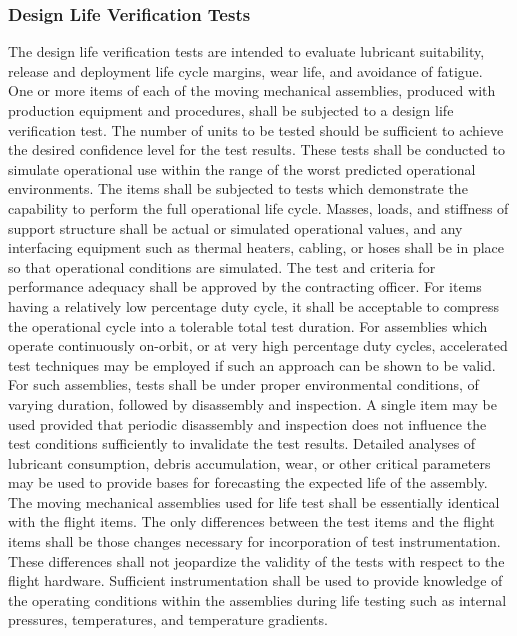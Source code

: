 \documentclass[12pt]{article}
\begin{document}
\subsubsection{Design Life Verification Tests} %
The design life verification tests are intended to evaluate lubricant suitability, release and deployment life cycle margins, wear life, and avoidance of fatigue. 
One or more items of each of the moving mechanical assemblies, produced with production equipment and procedures, shall be subjected to a design life verification test. 
The number of units to be tested should be sufficient to achieve the desired confidence level for the test results. 
These tests shall be conducted to simulate operational use within the range of the worst predicted operational environments. 
The items shall be subjected to tests which demonstrate the capability to perform the full operational life cycle. 
Masses, loads, and stiffness of support structure shall be actual or simulated operational values, and any interfacing equipment such as thermal heaters, cabling, or hoses shall be in place so that operational conditions are simulated. 
The test and criteria for performance adequacy shall be approved by the contracting officer. 
For items having a relatively low percentage duty cycle, it shall be acceptable to compress the operational cycle into a tolerable total test duration. 
For assemblies which operate continuously on-orbit, or at very high percentage duty cycles, accelerated test techniques may be employed if such an approach can be shown to be valid. 
For such assemblies, tests shall be under proper environmental conditions, of varying duration, followed by disassembly and inspection. 
A single item may be used provided that periodic disassembly and inspection does not influence the test conditions sufficiently to invalidate the test results.
Detailed analyses of lubricant consumption, debris accumulation, wear, or other critical parameters may be used to provide bases for forecasting the expected life of the assembly. 
The moving mechanical assemblies used for life test shall be essentially identical with the flight items. 
The only differences between the test items and the flight items shall be those changes necessary for incorporation of test instrumentation. 
These differences shall not jeopardize the validity of the tests with respect to the flight hardware. 
Sufficient instrumentation shall be used to provide knowledge of the operating conditions within the assemblies during life testing such as internal pressures, temperatures, and temperature gradients. 
\end{document}
